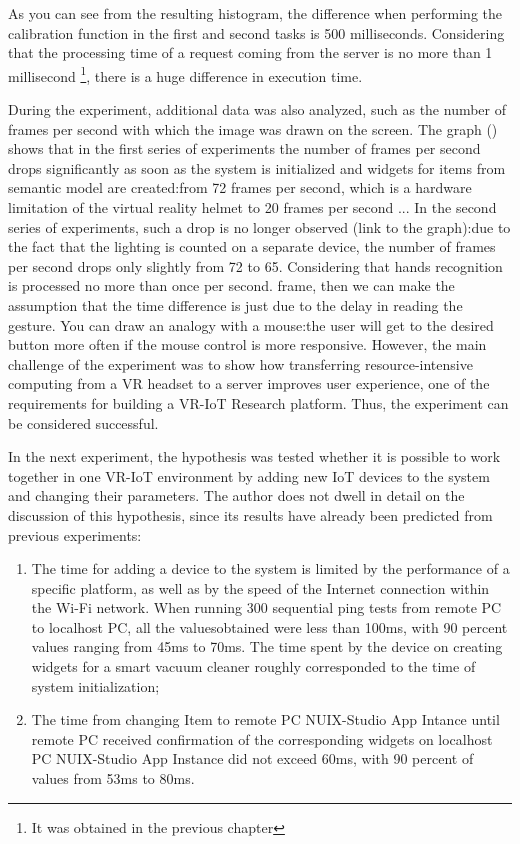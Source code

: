 As you can see from the resulting histogram, the difference when performing the calibration function in the first and second tasks is 500 milliseconds. Considering that the processing time of a request coming from the server is no more than 1 millisecond \footnote{It was obtained in the previous chapter}, there is a huge difference in execution time.

During the experiment, additional data was also analyzed, such as the number of frames per second with which the image was drawn on the screen. The graph () shows that in the first series of experiments the number of frames per second drops significantly as soon as the system is initialized and widgets for items from semantic model are created:from 72 frames per second, which is a hardware limitation of the virtual reality helmet to 20 frames per second ... In the second series of experiments, such a drop is no longer observed (link to the graph):due to the fact that the lighting is counted on a separate device, the number of frames per second drops only slightly from 72 to 65. Considering that hands recognition is processed no more than once per second. frame, then we can make the assumption that the time difference is just due to the delay in reading the gesture. You can draw an analogy with a mouse:the user will get to the desired button more often if the mouse control is more responsive. However, the main challenge of the experiment was to show how transferring resource-intensive computing from a VR headset to a server improves user experience, one of the requirements for building a VR-IoT Research platform. Thus, the experiment can be considered successful.


In the next experiment, the hypothesis was tested whether it is possible to work together in one VR-IoT environment by adding new IoT devices to the system and changing their parameters. The author does not dwell in detail on the discussion of this hypothesis, since its results have already been predicted from previous experiments:
\begin{enumerate}
    \item The time for adding a device to the system is limited by the performance of a specific platform, as well as by the speed of the Internet connection within the Wi-Fi network. When running 300 sequential ping tests from remote PC to localhost PC, all the values ​​obtained were less than 100ms, with 90 percent values ​​ranging from 45ms to 70ms. The time spent by the device on creating widgets for a smart vacuum cleaner roughly corresponded to the time of system initialization;
    \item The time from changing Item to remote PC NUIX-Studio App Intance until remote PC received confirmation of the corresponding widgets on localhost PC NUIX-Studio App Instance did not exceed 60ms, with 90 percent of values ​​from 53ms to 80ms.
\end{enumerate}

